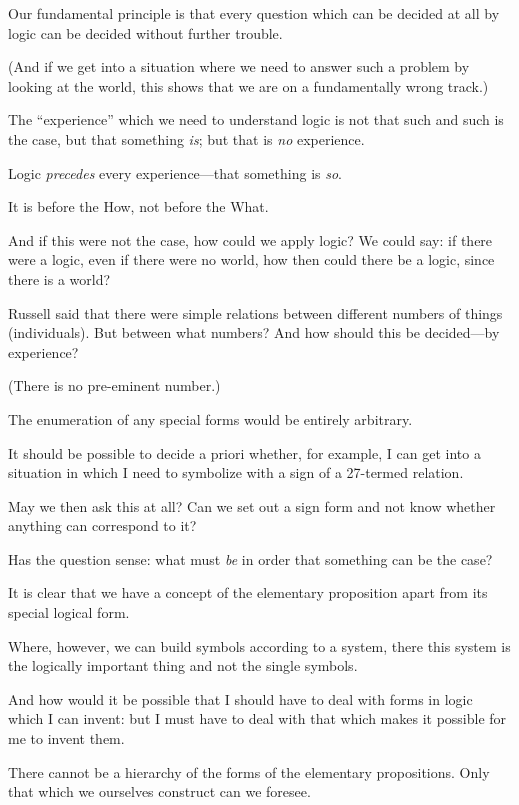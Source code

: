 {Our fundamental principle is that every question
which can be decided at all by logic can be decided
without further trouble.

(And if we get into a situation where we need
to answer such a problem by looking at the world,
this shows that we are on a fundamentally wrong
track.)}


{The ``experience'' which we need to understand
logic is not that such and such is the
case, but that something \emph{is}; but that is \emph{no} experience.

Logic \emph{precedes} every experience---that something
is \emph{so}.

It is before the How, not before the What.}


{And if this were not the case, how could
we apply logic? We could say: if there
were a logic, even if there were no world,
how then could there be a logic, since there is a
world?}


{Russell said that there were simple relations
between different numbers of things (individuals).
But between what numbers? And how should
this be decided---by experience?

(There is no pre-eminent number.)}


{The enumeration of any special forms would
be entirely arbitrary.}


{It should be possible to decide a priori whether,
for example, I can get into a situation in which
I need to symbolize with a sign of a 27-termed
relation.}


{May we then ask this at all? Can we set out
a sign form and not know whether anything can
correspond to it?

Has the question sense: what must \emph{be} in order
that something can be the case?}


{It is clear that we have a concept of the
elementary proposition apart from its special
logical form.

Where, however, we can build symbols
according to a system, there this system is the
logically important thing and not the single
symbols.

And how would it be possible that I should
have to deal with forms in logic which I can
invent: but I must have to deal with that which
makes it possible for me to invent them.}


{There cannot be a hierarchy of the forms of the
elementary propositions. Only that which we
ourselves construct can we foresee.}


